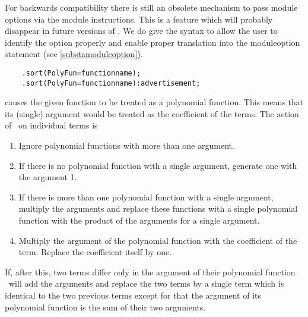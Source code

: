 For backwards compatibility there is still an obsolete 
mechanism to pass module options via the module instructions. This is a 
feature which will probably disappear in future versions of \FORM. We do 
give the syntax to allow the user to identify the option properly and 
enable proper translation into the moduleoption 
statement (see \ref{substamoduleoption}).
\begin{verbatim}
    .sort(PolyFun=functionname);
    .sort(PolyFun=functionname):advertisement;
\end{verbatim}
causes the given function to be treated as a polynomial 
function. This means that its (single) argument would be treated as the 
coefficient of the terms. The action of \FORM\ on individual terms is
\begin{enumerate}
\item Ignore polynomial functions with more than one argument.
\item If there is no polynomial function with a single argument, generate 
one with the argument 1.\item If there is more than one polynomial function 
with a single argument, multiply the arguments and replace these functions 
with a single polynomial function with the product of the arguments for a 
single argument.
\item Multiply the argument of the polynomial function with the coefficient 
of the term. Replace the coefficient itself by one.
\end{enumerate}
If, after this, two terms differ only in the argument of their polynomial 
function \FORM\ will add the arguments and replace the two terms by a single 
term which is identical to the two previous terms except for that the 
argument of its polynomial function is the sum of their two arguments.

